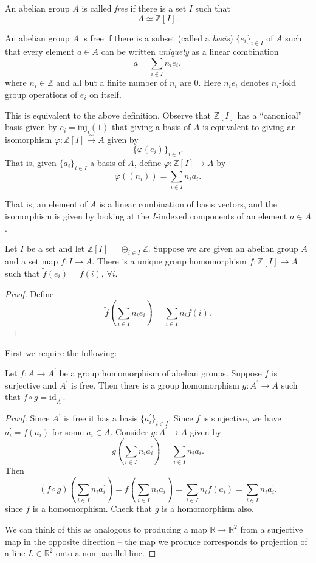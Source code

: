 \begin{defn}
An abelian group $A$ is called \emph{free} if there is a set $I$ such
that
$$
A \simeq \mathbb{Z}[I].
$$
\end{defn}

\begin{defn}[Equivalent]
An abelian group $A$ is free if there is a subset (called a \emph{basis})
$\{ e_i \}_{i \in I}$ of $A$ such that every element $a \in A$ can be
written \emph{uniquely} as a linear combination
$$
a = \sum_{i \in I} n_i e_i,
$$
where $n_i \in \mathbb{Z}$ and all but a finite number of $n_i$ are 0.
Here $n_i e_i$ denotes $n_i$-fold group
operations of $e_i$ on itself.

This is equivalent to the above definition. Observe that
$\mathbb{Z}[I]$ has a ``canonical'' basis given by
$e_i = \mathrm{inj}_i(1)$ that giving a basis of $A$ is
equivalent to giving an isomorphism
$\varphi : \mathbb{Z}[I] \xrightarrow{\sim} A$ given by
$$
\{\varphi(e_i)\}_{i \in I}.
$$
That is, given $\{ a_i \}_{i \in I}$ a basis of $A$, define
$\varphi : \mathbb{Z}[I] \to A$ by
$$
\varphi((n_i)) = \sum_{i \in I} n_i a_i.
$$
\end{defn}
That is, an element of $A$ is a linear combination of basis vectors,
and the isomorphism is given by looking at the $I$-indexed components
of an element $a \in A$.

\begin{prop}
Let $I$ be a set and let
$\mathbb{Z}[I] = \oplus_{i \in I} \mathbb{Z}$.
Suppose we are given an abelian group $A$ and a set map
$f : I \to A$. There is a unique group homomorphism
$\tilde{f} : \mathbb{Z}[I] \to A$ such that
$\tilde{f}(e_i) = f(i)$, $\forall i$.
\end{prop}

\begin{proof}
Define
$$
\tilde{f}\left(\sum_{i \in I} n_i e_i\right)
= \sum_{i \in I} n_i f(i).
$$
\end{proof}

First we require the following:
\begin{lemma}
Let $f : A \to A^\prime$ be a group homomorphism of abelian
groups. Suppose $f$ is surjective and $A^\prime$ is free. Then there
is a group homomorphism $g : A^\prime \to A$ such that
$f \circ g = \mathrm{id}_{A^\prime}$.
\end{lemma}
\begin{proof}
Since $A^\prime$ is free it has a basis $\{ a_i^\prime \}_{i \in
  I}$. Since $f$ is surjective, we have $a_i^\prime = f(a_i)$ for some
$a_i \in A$. Consider $g : A^\prime \to A$ given by
$$
g\left(\sum_{i \in I} n_i a_i^\prime\right) = \sum_{i \in I} n_i a_i.
$$
Then
$$
(f \circ g)\left(\sum_{i \in I} n_i a_i^\prime\right)
= f\left(\sum_{i \in I} n_i a_i\right)
= \sum_{i \in I} n_i f(a_i)
= \sum_{i \in I} n_i a_i^\prime.
$$
since $f$ is a homomorphism. Check that $g$ is a homomorphism also.

We can think of this as analogous to producing a map
$\mathbb{R} \to \mathbb{R}^2$ from a surjective map in the opposite
direction -- the map we produce corresponds to projection of a line
$L \in \mathbb{R}^2$ onto a non-parallel line.
\end{proof}

